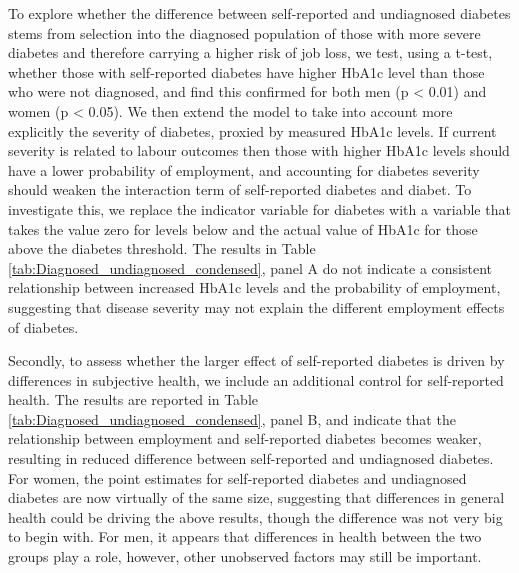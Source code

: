 \documentclass[12pt,english]{article}
\begin{document}
To explore whether the difference between self-reported and undiagnosed diabetes stems from selection into the diagnosed population of those with more severe diabetes and therefore carrying a higher risk of job loss,  we test, using a t-test, whether those with self-reported diabetes have  higher \ac{HbA1c}  level than those who were not diagnosed, and find this confirmed for both men (p < 0.01) and women (p < 0.05). We then extend the model to take into account more explicitly the severity of diabetes, proxied by measured \ac{HbA1c} levels. If current severity is related to labour outcomes then those with higher \ac{HbA1c} levels should have a lower probability of employment, and accounting for diabetes severity should weaken the interaction term of self-reported diabetes and diabet.  To investigate this, we replace the indicator variable for diabetes with a variable that takes the value zero for levels below and the actual value of \ac{HbA1c} for those above the diabetes threshold. The results in Table \ref{tab:Diagnosed_undiagnosed_condensed}, panel A do not indicate a consistent relationship between increased \ac{HbA1c} levels and the probability of employment, suggesting that disease severity may not explain the different employment effects of diabetes. 

Secondly, to assess whether the larger effect of self-reported diabetes is driven by differences in subjective health, we include an additional control for self-reported health. The results are reported in Table \ref{tab:Diagnosed_undiagnosed_condensed}, panel B, and indicate that the relationship between employment and self-reported diabetes becomes weaker, resulting in reduced difference between self-reported and undiagnosed diabetes. For women, the point estimates for self-reported diabetes and undiagnosed diabetes are now virtually of the same size, suggesting that differences in general health could be driving the above results, though the difference was not very big to begin with. For men, it appears that differences in health between the two groups play a role, however, other unobserved factors may still be important.
\end{document}
